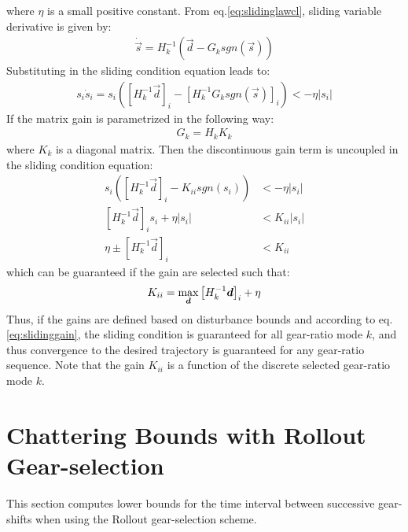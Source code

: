%
where $\eta$ is a small positive constant. From eq.\eqref{eq:slidinglawcl}, sliding variable derivative is given by:
%
\begin{align}
\dot{\vec{s}} = H_k^{-1}(\vec{d} - G_k sgn( \vec{s} ))
\end{align}
%
Substituting in the sliding condition equation leads to:
%
\begin{align}
s_i \dot{s}_i  = s_i \left( \left[ H_k^{-1} \vec{d} \right]_i - \left[ H_k^{-1} G_k sgn(\vec{s}) \right]_i \right) < -\eta |s_i|
\end{align}
%
If the matrix gain is parametrized in the following way:
%
\begin{align}
G_k = H_k K_k
\end{align}
%
where $K_k$ is a diagonal matrix. Then the discontinuous gain term is uncoupled in the sliding condition equation:
%
\begin{align}
s_i \left( \left[ H_k^{-1} \vec{d} \right]_i - K_{ii} sgn( s_i ) \right) &< -\eta |s_i| \\
 \left[ H_k^{-1} \vec{d} \right]_i s_i + \eta |s_i| &< K_{ii} | s_i | \\
 \eta  \pm  \left[ H_k^{-1} \vec{d} \right]_i &< K_{ii} 
\end{align}
%
which can be guaranteed if the gain are selected such that:
%
\begin{align}
K_{ii} = \operatornamewithlimits{max}\limits_{\vec{d}} \left[ H_k^{-1} \vec{d} \right]_i + \eta
\label{eq:slidinggain}
\end{align}
%
Thus, if the gains are defined based on disturbance bounds and according to eq.\eqref{eq:slidinggain}, the sliding condition is guaranteed for all gear-ratio mode $k$, and thus convergence to the desired trajectory is guaranteed for any gear-ratio sequence. Note that the gain $K_{ii}$ is a function of the discrete selected gear-ratio mode $k$. 




\newpage

\section{Chattering Bounds with Rollout Gear-selection}
\label{sec:chat}

This section computes lower bounds for the time interval between successive gear-shifts when using the Rollout gear-selection scheme. 

